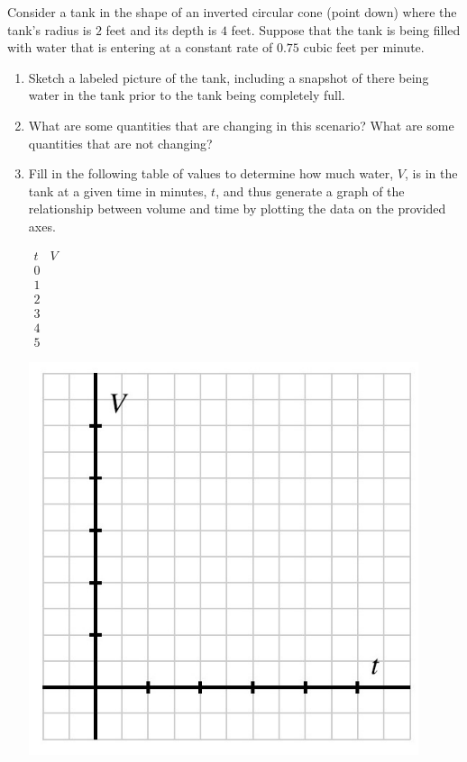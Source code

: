\documentclass{ximera}
\begin{document}
\begin{exploration}
Consider a tank in the shape of an inverted circular cone (point down) where the tank's radius is \(2\) feet and its depth is \(4\) feet.  Suppose that the tank is being filled with water that is entering at a constant rate of \(0.75\) cubic feet per minute.%
\begin{enumerate}[label=\alph*.]
\item Sketch a labeled picture of the tank, including a snapshot of there being water in the tank prior to the tank being completely full.%
\item What are some quantities that are changing in this scenario?  What are some quantities that are not changing?%
\item Fill in the following table of values to determine how much water, \(V\), is in the tank at a given time in minutes, \(t\), and thus generate a graph of the relationship between volume and time by plotting the data on the provided axes.%

\begin{center}
\(
\begin{array}{cc}
t&V\\
\hline
0&\\
1&\\
2&\\
3&\\
4&\\
5&
\end{array}
\)
\end{center}


\begin{image}
\includegraphics[width=0.9\textwidth]{CiTtext4.jpg}
\end{image}


\end{enumerate}
\end{exploration}
\end{document}

